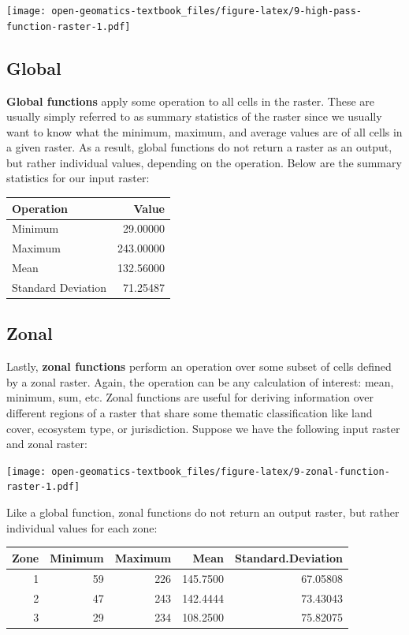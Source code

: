 \documentclass[
]{book}
\begin{document}
\texttt{[image: open-geomatics-textbook\_files/figure-latex/9-high-pass-function-raster-1.pdf]}

\hypertarget{global}{%
\subsection{Global}\label{global}}

\textbf{Global functions} apply some operation to all cells in the raster. These are usually simply referred to as summary statistics of the raster since we usually want to know what the minimum, maximum, and average values are of all cells in a given raster. As a result, global functions do not return a raster as an output, but rather individual values, depending on the operation. Below are the summary statistics for our input raster:

\begin{tabular}{lr}
\toprule
Operation & Value\\
\midrule
Minimum & 29.00000\\
Maximum & 243.00000\\
Mean & 132.56000\\
Standard Deviation & 71.25487\\
\bottomrule
\end{tabular}

\hypertarget{zonal}{%
\subsection{Zonal}\label{zonal}}

Lastly, \textbf{zonal functions} perform an operation over some subset of cells defined by a zonal raster. Again, the operation can be any calculation of interest: mean, minimum, sum, etc. Zonal functions are useful for deriving information over different regions of a raster that share some thematic classification like land cover, ecosystem type, or jurisdiction. Suppose we have the following input raster and zonal raster:

\texttt{[image: open-geomatics-textbook\_files/figure-latex/9-zonal-function-raster-1.pdf]}

Like a global function, zonal functions do not return an output raster, but rather individual values for each zone:

\begin{tabular}{rrrrr}
\toprule
Zone & Minimum & Maximum & Mean & Standard.Deviation\\
\midrule
1 & 59 & 226 & 145.7500 & 67.05808\\
2 & 47 & 243 & 142.4444 & 73.43043\\
3 & 29 & 234 & 108.2500 & 75.82075\\
\bottomrule
\end{tabular}
\end{document}
